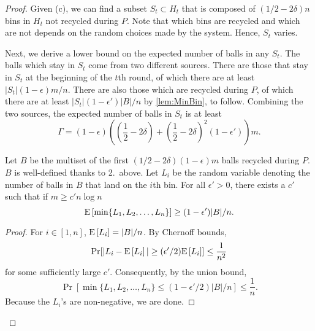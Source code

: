 \begin{proof}
	Given (c), we can find a subset $S_t \subset H_t$ that is composed of
	$(1/2-2\delta)n$ bins in $H_t$ not recycled during $P$.  Note that which
	bins are recycled and which are not depends on the random choices made by the
	system. Hence, $S_t$ varies.  
		
	Next, we derive a lower bound on the expected number of balls in any $S_t$.
	The balls which stay in $S_t$ come from two different sources. There are
	those that stay in $S_t$ at the beginning of the $t$th round, of which
	there are at least $|S_t|(1-\epsilon)m/n$.  There are also those which are
	recycled during $P$, of which there are at least
	$|S_t|(1-\epsilon')|B|/n$ by \cref{lem:MinBin}, to follow.  Combining the
	two sources, the expected number of balls in $S_t$ is at least
	\begin{equation*}
		\Gamma = (1-\epsilon)\left( \left(\frac{1}{2}-2\delta\right) +
		\left(\frac{1}{2}-2\delta\right)^2(1-\epsilon')\right)m.
	\end{equation*}

	\begin{lemma}\label{lem:MinBin}
	Let $B$ be the multiset of the first $(1/2-2\delta)(1-\epsilon)m$ balls
	recycled during $P$. $B$ is well-defined thanks to 2.\ above. Let $L_i$ be
	the random variable denoting the number of balls in $B$ that land on the
	$i$th bin. For all $\epsilon' > 0$, there exists a $c'$ such
        that if $m \ge c' n \log n$
		\begin{equation*}
			\mathrm{E}\left[\min\{L_1, L_2, \ldots, L_n\}\right] \ge (1-\epsilon')|B|/n.
		\end{equation*}
	\end{lemma}
	\begin{proof}
		For $i \in [1,n]$, $\mathrm{E}\left[L_i\right] = |B|/n$.
		By Chernoff bounds, 
		$$
			\Pr[|L_i-\mathrm{E}\left[L_i\right]| \ge (\epsilon'/2) \mathrm{E}\left[L_i\right]] \le \frac{1}{n^2} 
		$$
		for some sufficiently large $c'$. Consequently, by the union bound,
		$$
			\Pr[\min\{L_1, L_2, \ldots, L_n\} \le (1-\epsilon'/2)|B|/n] \le \frac{1}{n}.
		$$
		Because the $L_i$'s are non-negative, we are done. 
	\end{proof}


\end{proof}
